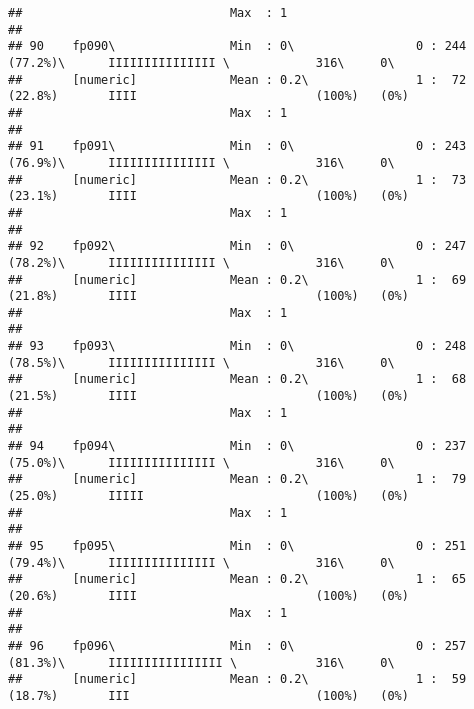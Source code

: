 \documentclass[]{article}
\begin{document}
\begin{verbatim}
##                             Max  : 1                                                                                       
## 
## 90    fp090\                Min  : 0\                 0 : 244 (77.2%)\      IIIIIIIIIIIIIII \            316\     0\       
##       [numeric]             Mean : 0.2\               1 :  72 (22.8%)       IIII                         (100%)   (0%)     
##                             Max  : 1                                                                                       
## 
## 91    fp091\                Min  : 0\                 0 : 243 (76.9%)\      IIIIIIIIIIIIIII \            316\     0\       
##       [numeric]             Mean : 0.2\               1 :  73 (23.1%)       IIII                         (100%)   (0%)     
##                             Max  : 1                                                                                       
## 
## 92    fp092\                Min  : 0\                 0 : 247 (78.2%)\      IIIIIIIIIIIIIII \            316\     0\       
##       [numeric]             Mean : 0.2\               1 :  69 (21.8%)       IIII                         (100%)   (0%)     
##                             Max  : 1                                                                                       
## 
## 93    fp093\                Min  : 0\                 0 : 248 (78.5%)\      IIIIIIIIIIIIIII \            316\     0\       
##       [numeric]             Mean : 0.2\               1 :  68 (21.5%)       IIII                         (100%)   (0%)     
##                             Max  : 1                                                                                       
## 
## 94    fp094\                Min  : 0\                 0 : 237 (75.0%)\      IIIIIIIIIIIIIII \            316\     0\       
##       [numeric]             Mean : 0.2\               1 :  79 (25.0%)       IIIII                        (100%)   (0%)     
##                             Max  : 1                                                                                       
## 
## 95    fp095\                Min  : 0\                 0 : 251 (79.4%)\      IIIIIIIIIIIIIII \            316\     0\       
##       [numeric]             Mean : 0.2\               1 :  65 (20.6%)       IIII                         (100%)   (0%)     
##                             Max  : 1                                                                                       
## 
## 96    fp096\                Min  : 0\                 0 : 257 (81.3%)\      IIIIIIIIIIIIIIII \           316\     0\       
##       [numeric]             Mean : 0.2\               1 :  59 (18.7%)       III                          (100%)   (0%)     

\end{verbatim}
\end{document}
